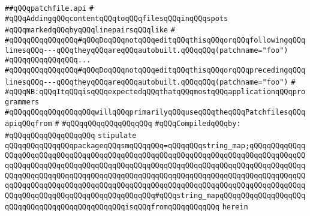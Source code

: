 \label{src/lib/make-library-glue/patchfile.api}
\verb|##qQQqpatchfile.api|\newline
\verb|#|\newline
\verb|#qQQqAddingqQQqcontentqQQqtoqQQqfilesqQQqinqQQqspots|\newline
\verb|#qQQqmarkedqQQqbyqQQqlinepairsqQQqlike|\newline
\verb|#|\newline
\verb|#qQQqqQQqqQQqqQQq#qQQqDoqQQqnotqQQqeditqQQqthisqQQqorqQQqfollowingqQQqlinesqQQq---qQQqtheyqQQqareqQQqautobuilt.qQQqqQQq(patchname="foo")|\newline
\verb|#qQQqqQQqqQQqqQQq...|\newline
\verb|#qQQqqQQqqQQqqQQq#qQQqDoqQQqnotqQQqeditqQQqthisqQQqorqQQqprecedingqQQqlinesqQQq---qQQqtheyqQQqareqQQqautobuilt.qQQqqQQq(patchname="foo")|\newline
\verb|#|\newline
\verb|#qQQqNB:qQQqItqQQqisqQQqexpectedqQQqthatqQQqmostqQQqapplicationqQQqprogrammers|\newline
\verb|#qQQqqQQqqQQqqQQqqQQqwillqQQqprimarilyqQQquseqQQqtheqQQqPatchfilesqQQqapiqQQqfrom|\newline
\verb|#|\newline
\verb|#qQQqqQQqqQQqqQQqqQQq|\newline
\newline
\verb|#qQQqCompiledqQQqby:|\newline
\verb|#qQQqqQQqqQQqqQQqqQQq|\newline
\newline
\newline
\verb|stipulate|\newline
\verb|qQQqqQQqqQQqqQQqpackageqQQqsmqQQqqQQq=qQQqqQQqstring_map;qQQqqQQqqQQqqQQqqQQqqQQqqQQqqQQqqQQqqQQqqQQqqQQqqQQqqQQqqQQqqQQqqQQqqQQqqQQqqQQqqQQqqQQqqQQqqQQqqQQqqQQqqQQqqQQqqQQqqQQqqQQqqQQqqQQqqQQqqQQqqQQqqQQqqQQqqQQqqQQqqQQqqQQqqQQqqQQqqQQqqQQqqQQqqQQqqQQqqQQqqQQqqQQqqQQqqQQqqQQqqQQqqQQqqQQqqQQqqQQqqQQqqQQqqQQqqQQqqQQqqQQqqQQqqQQqqQQqqQQqqQQqqQQqqQQqqQQqqQQqqQQqqQQqqQQqqQQqqQQqqQQqqQQq#qQQqstring_mapqQQqqQQqqQQqqQQqqQQqqQQqqQQqqQQqqQQqqQQqqQQqqQQqisqQQqfromqQQqqQQqqQQq|\newline
\verb|herein|\newline
\newline
